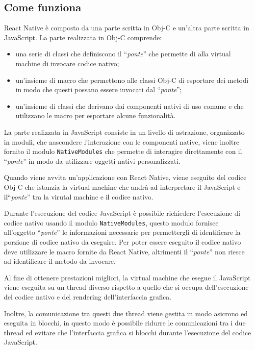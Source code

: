 \subsection{Come funziona}

React Native è composto da una parte scritta in Obj-C e un'altra parte scritta in JavaScript.
La parte realizzata in Obj-C comprende:
\begin{itemize}
\item una serie di classi che definiscono il ``\textit{ponte}'' che permette di alla virtual machine di invocare codice nativo;
\item un'insieme di macro che permettono alle classi Obj-C di esportare dei metodi in modo che questi possano essere invocati dal ``\textit{ponte}'';
\item un'insieme di classi che derivano dai componenti nativi di uso comune e che utilizzano le macro per esportare alcune funzionalità.
\end{itemize}
La parte realizzata in JavaScript consiste in un livello di astrazione, organizzato in moduli, che nascondere l'interazione con le componenti native, viene inoltre fornito il modulo \texttt{NativeModules} che permette di interagire direttamente con il ``\textit{ponte}'' in modo da utilizzare oggetti nativi personalizzati.

Quando viene avvita un'applicazione con React Native, viene eseguito del codice Obj-C che istanzia la virtual machine che andrà ad interpretare il JavaScript e il``\textit{ponte}'' tra la virutal machine e il codice nativo.

Durante l'esecuzione del codice JavaScript è possibile richiedere l'esecuzione di codice nativo usando il modulo \texttt{NativeModules}, questo modulo fornisce all'oggetto ``\textit{ponte}'' le informazioni necessarie per permettergli di identificare la porzione di codice nativo da eseguire.
Per poter essere eseguito il codice nativo deve utilizzare le macro fornite da React Native, altrimenti il ``\textit{ponte}'' non riesce ad identificare il metodo da invocare.

Al fine di ottenere prestazioni migliori, la virtual machine che esegue il JavaScript viene eseguita su un thread diverso rispetto a quello che si occupa dell'esecuzione del codice nativo e del rendering dell'interfaccia grafica.

Inoltre, la comunicazione tra questi due thread viene gestita in modo asicrono ed eseguita in blocchi, in questo modo è possibile ridurre le comunicazioni tra i due thread ed evitare che l'interfaccia grafica si blocchi durante l'esecuzione del codice JavaScript.

